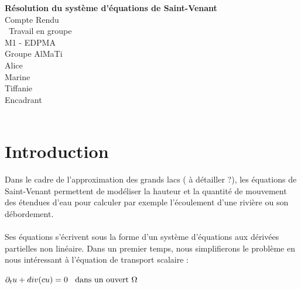 \documentclass[12pt]{article}
\begin{document}
\begin{titlepage}
\begin{center}


\vspace{3cm}

\huge
\textbf{Résolution du système d'équations de Saint-Venant} \\
\vspace{0.7cm}
\Large
Compte Rendu\\
\ Travail en groupe \\
\large
\vspace{0.7cm}
M1 - EDPMA\\
Groupe {\color{orange}Al}{\color{OliveGreen}Ma}{\color{violet}Ti}\\
\vspace{0.7cm}
{\color{orange}Al}ice  \\{\color{OliveGreen} Ma}rine  \\ {\color{violet}Ti}ffanie  \\
\vspace{0.7cm}
Encadrant\\
\\
\end{center}
\end{titlepage}

\normalsize

\newpage
\tableofcontents
\newpage
\section{Introduction}

\noindent Dans le cadre de l'approximation des grands lacs ( à détailler ?), les équations de Saint-Venant permettent de modéliser la hauteur et la quantité de mouvement des étendues d'eau pour calculer par exemple l'écoulement d'une rivière ou son débordement. 
\\
\\Ses équations s'écrivent sous la forme d'un système d'équations aux dérivées partielles non linéaire. Dans un premier temps, nous simplifierons le problème en nous intéressant à l'équation de transport scalaire :

\begin{center}
    $\partial_t u + div(cu) = 0 \text{ \: dans un ouvert } \Omega $
\end{center}
\end{document}
